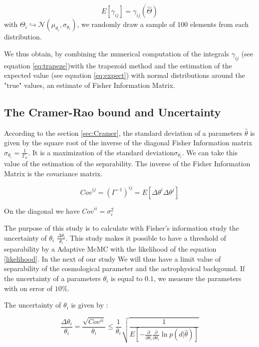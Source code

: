 \documentclass[a4paper,12pt]{article}
\begin{document}
\begin{equation}\label{eq:expect}
    E\left[\gamma_{ij}\right] = \overline{\gamma_{ij}\left(\widehat{\Theta}\right)}
\end{equation}
with $\Theta_i \hookrightarrow \mathcal{N}(\mu_{\theta_i},\sigma_{\theta_i})$, we randomly draw a sample of 100 elements from each distribution.
 
We thus obtain, by combining the numerical computation of the integrals $\gamma_{ij}$ (see equation \ref{eq:trapeze})with the trapezoid method and the estimation of the expected value (see equation \ref{eq:expect}) with normal distributions around the "true" values, an estimate of Fisher Information Matrix.

\subsection{The Cramer-Rao bound and Uncertainty}

According to the section \ref{sec:Cramer}, the standard deviation of a parameters $\widehat{\theta}$ is given by the square root of the inverse of the diagonal Fisher Information matrix $ \sigma_{\theta_{i}} = \frac{1}{\Gamma_{ii}}$. It is a maximization of the standard deviation$ \sigma_{\theta_{i}}$. We can take this value of the estimation of the separability. The inverse of the Fisher Information Matrix is the covariance matrix. 

\begin{equation}
    {Cov}^{ij} = (\Gamma^{-1})^{ij} = E[\Delta\theta^i \Delta \theta^j]
\end{equation}

On the diagonal we have ${Cov}^{ii} = \sigma_i^2$


The purpose of this study is to calculate with Fisher's information study the uncertainty of $\theta_i$ $\frac{\Delta \theta_i}{\theta_i}$. This study makes it possible to have a threshold of separability by a Adaptive McMC with the likelihood of the equation~ \ref{likelihood}. In the next of our study We will thus have a limit value of separability of the cosmological parameter and the astrophysical backgound. If the uncertainty of a parameters $\theta_i$ is equal to $0.1$, we measure the parameters with on error of $10\%$.

The uncertainty of $\theta_i$ is given by : 

\begin{equation}
    \frac{\Delta \theta_i}{\theta_i} = \frac{\sqrt{Cov^{ii}}}{\theta_i} \le \frac{1}{\theta_i}\sqrt{\frac{1}{ E\left[-\frac{\partial}{\partial \theta_i}\frac{\partial}{\partial \theta_i} \ln{p(d|\widehat{\theta})}\right]}} 
\end{equation}
\end{document}
